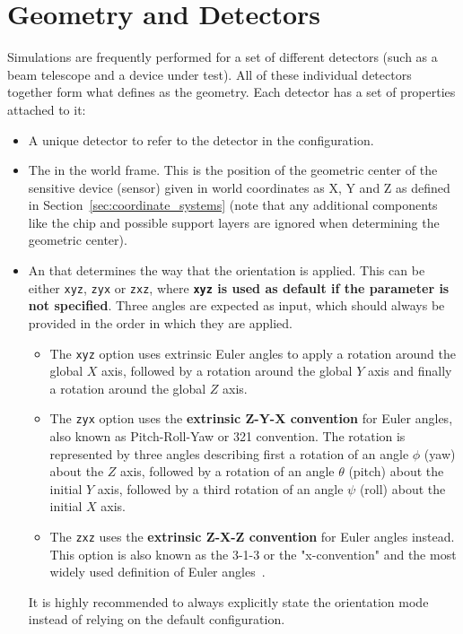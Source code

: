 \section{Geometry and Detectors}
\label{sec:models_geometry}
Simulations are frequently performed for a set of different detectors (such as a beam telescope and a device under test).
All of these individual detectors together form what \apsq defines as the geometry.
Each detector has a set of properties attached to it:
\begin{itemize}
\item A unique detector  to refer to the detector in the configuration.
\item The  in the world frame.
This is the position of the geometric center of the sensitive device (sensor) given in world coordinates as X, Y and Z as defined in Section~\ref{sec:coordinate_systems} (note that any additional components like the chip and possible support layers are ignored when determining the geometric center).
\item An  that determines the way that the orientation is applied.
This can be either \texttt{xyz}, \texttt{zyx} or \texttt{zxz}, where \textbf{\texttt{xyz} is used as default if the parameter is not specified}. Three angles are expected as input, which should always be provided in the order in which they are applied.
\begin{itemize}
    \item The \texttt{xyz} option uses extrinsic Euler angles to apply a rotation around the global $X$ axis, followed by a rotation around the global $Y$ axis and finally a rotation around the global $Z$ axis.
    \item The \texttt{zyx} option uses the \textbf{extrinsic Z-Y-X convention} for Euler angles, also known as Pitch-Roll-Yaw or 321 convention. The rotation is represented by three angles describing first a rotation of an angle $\phi$ (yaw) about the $Z$ axis, followed by a rotation of an angle $\theta$ (pitch) about the initial $Y$ axis, followed by a third rotation of an angle $\psi$ (roll) about the initial $X$ axis.
    \item The \texttt{zxz} uses the \textbf{extrinsic Z-X-Z convention} for Euler angles instead. This option is also known as the 3-1-3 or the "x-convention" and the most widely used definition of Euler angles~\cite{eulerangles}.
\end{itemize}
\begin{warning}
It is highly recommended to always explicitly state the orientation mode instead of relying on the default configuration.
\end{warning}


\end{itemize}
